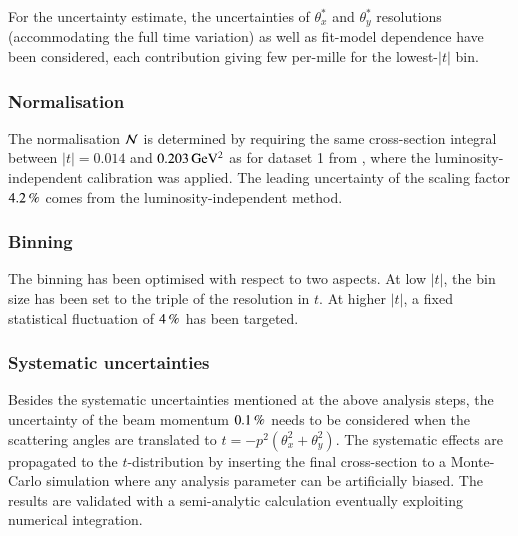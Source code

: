 For the uncertainty estimate, the uncertainties of $\theta_x^*$ and $\theta_y^*$ resolutions (accommodating the full time variation) as well as fit-model dependence have been considered, each contribution giving few per-mille for the lowest-$|t|$ bin.

\subsubsection{Normalisation}

The normalisation ${\cal N}$ is determined by requiring the same cross-section integral between $|t| = 0.014$ and $0.203\,{\rm GeV^2}$ as for dataset 1 from \cite{prl111}, where the luminosity-independent calibration was applied. The leading uncertainty of the scaling factor $4.2\,{\rm \%}$ comes from the luminosity-independent method.



\subsubsection{Binning}

The binning has been optimised with respect to two aspects. At low $|t|$, the bin size has been set to the triple of the resolution in $t$. At higher $|t|$, a fixed statistical fluctuation of $4\,{\rm \%}$ has been targeted. 



\subsubsection{Systematic uncertainties}

Besides the systematic uncertainties mentioned at the above analysis steps, the uncertainty of the beam momentum $0.1\,{\rm \%}$ needs to be considered when the scattering angles are translated to $t = - p^2 (\theta_x^2 + \theta_y^2)$. The systematic effects are propagated to the $t$-distribution by inserting the final cross-section to a Monte-Carlo simulation where any analysis parameter can be artificially biased. The results are validated with a semi-analytic calculation eventually exploiting numerical integration.

